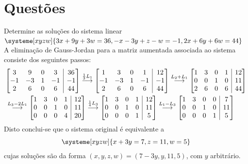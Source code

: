 \documentclass[12pt,a4paper]{article}
\makeatletter
\newenvironment{amatrix}[1]{%
  \left[\begin{array}{@{}*{#1}{c}|c@{}}
}{%
  \end{array}\right]
}
\newcommand{\grstep}[2][\relax]{%
   \ensuremath{\mathrel{
       {\mathop{\longrightarrow}\limits^{#2\mathstrut}_{
                                     \begin{subarray}{l} #1 \end{subarray}}}}}}
\makeatother
\begin{document}
\section*{Questões}
\begin{ExerciseList}


\Exercise[title={1,8}] Determine as soluções do sistema linear
$
\systeme[xyzw]{
3x+9y+3w=36,
-x-3y+z-w=-1,
2x+6y+6w=44
}
$
\Answer A eliminação de Gauss-Jordan para a matriz aumentada associada ao sistema consiste dos seguintes passos:
\begin{align*}
&
\begin{amatrix}{4}
3 & 9 & 0 & 3 & 36 \\
-1 & -3 & 1 & -1& -1\\
2 & 6 & 0 & 6 & 44
\end{amatrix}
\grstep{ \frac{1}{3}L_1 }
\begin{amatrix}{4}
1 & 3 & 0 & 1 & 12 \\
-1 & -3 & 1 & -1& -1\\
2 & 6 & 0 & 6 & 44
\end{amatrix}
\grstep{ L_2 + L_1 }
\begin{amatrix}{4}
1 & 3 & 0 & 1 & 12 \\
0 & 0 & 1 & 0 & 11\\
2 & 6 & 0 & 6 & 44
\end{amatrix}\\
&
\grstep{ L_3 - 2 L_1 }
\begin{amatrix}{4}
1 & 3 & 0 & 1 & 12 \\
0 & 0 & 1 & 0 & 11\\
0 & 0 & 0 & 4 & 20
\end{amatrix}
\grstep{ \frac{1}{4} L_3 }
\begin{amatrix}{4}
1 & 3 & 0 & 1 & 12 \\
0 & 0 & 1 & 0 & 11\\
0 & 0 & 0 & 1 & 5
\end{amatrix}
\grstep{ L_1-L_3 }
\begin{amatrix}{4}
1 & 3 & 0 & 0 & 7 \\
0 & 0 & 1 & 0 & 11\\
0 & 0 & 0 & 1 & 5
\end{amatrix}
\end{align*}
Disto conclui-se que o sistema original é equivalente a
\[
\systeme[xyzw]{
x+3y=7,
z=11,
w=5
}
\]
cujas soluções são da forma $(x,y,z,w) = (7-3y,y,11,5)$, com $y$ arbitrário.



\end{ExerciseList}
\end{document}
